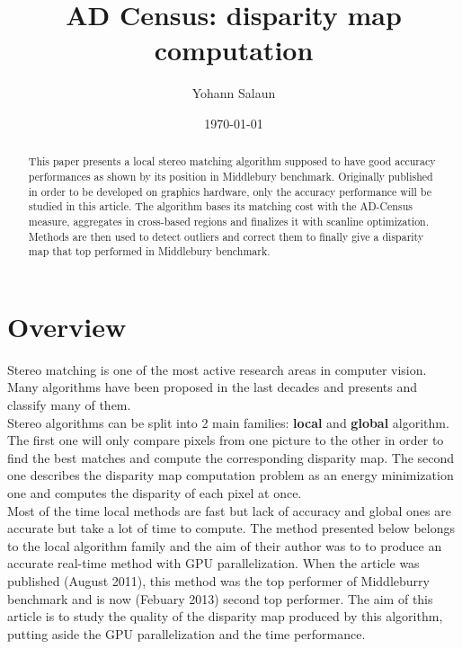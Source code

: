 \documentclass{article}
\title{AD Census: disparity map computation}
\author{Yohann Salaun}
\date{\today}
\begin{document}
\maketitle

\begin{abstract}
This paper presents a local stereo matching algorithm supposed to have good accuracy performances as shown by its position in Middlebury benchmark. Originally published in order to be developed on graphics hardware, only the accuracy performance will be studied in this article. The algorithm bases its matching cost with the AD-Census measure, aggregates in cross-based regions and finalizes it with scanline optimization. Methods are then used to detect outliers and correct them to finally give a disparity map that top performed in Middlebury benchmark.
\end{abstract} 

\section{Overview}

Stereo matching is one of the most active research areas in computer vision. Many algorithms have been proposed in the last decades and  \cite{stereoTaxonomy} presents and classify many of them.\\
Stereo algorithms can be split into 2 main families: \textbf{local} and \textbf{global} algorithm. The first one will only compare pixels from one picture to the other in order to find the best matches and compute the corresponding disparity map. The second one describes the disparity map computation problem as an energy minimization one and computes the disparity of each pixel at once.\\
Most of the time local methods are fast but lack of accuracy and global ones are accurate but take a lot of time to compute. The method \cite{adCensus}  presented below belongs to the local algorithm family and the aim of their author was to to produce an accurate real-time method with GPU parallelization. When the article was published (August 2011), this method was the top performer of Middleburry benchmark \cite{middleBench} and is now (Febuary 2013) second top performer. The aim of this article is to study the quality of the disparity map produced by this algorithm, putting aside the GPU parallelization and the time performance.\\
\end{document}
